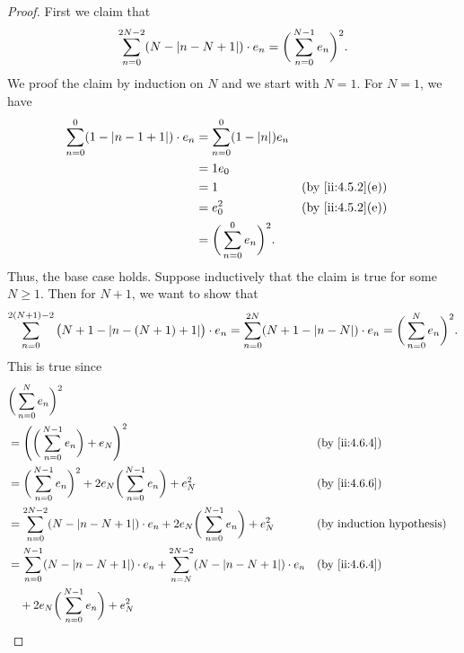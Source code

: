 \begin{proof}
  First we claim that
  \[
    \sum_{n = 0}^{2N - 2} (N - \left\lvert n - N + 1\right\rvert) \cdot e_n = \bigg(\sum_{n = 0}^{N - 1} e_n\bigg)^2.
  \]
  We proof the claim by induction on \(N\) and we start with \(N = 1\).
  For \(N = 1\), we have
  \begin{align*}
    \sum_{n = 0}^0 (1 - \abs{n - 1 + 1}) \cdot e_n & = \sum_{n = 0}^0 (1 - \abs{n}) e_n                        \\
                                                   & = 1 e_0                                                   \\
                                                   & = 1                                 &  & \by{ii:4.5.2}[e] \\
                                                   & = e_0^2                             &  & \by{ii:4.5.2}[e] \\
                                                   & = \bigg(\sum_{n = 0}^0 e_n\bigg)^2.
  \end{align*}
  Thus, the base case holds.
  Suppose inductively that the claim is true for some \(N \geq 1\).
  Then for \(N + 1\), we want to show that
  \[
    \sum_{n = 0}^{2(N + 1) - 2} \big(N + 1 - \abs{n - (N + 1) + 1}\big) \cdot e_n = \sum_{n = 0}^{2N} (N + 1 - \abs{n - N}) \cdot e_n = \bigg(\sum_{n = 0}^N e_n\bigg)^2.
  \]
  This is true since
  \begin{align*}
     & \bigg(\sum_{n = 0}^N e_n\bigg)^2                                                                                                                  \\
     & = \Bigg(\bigg(\sum_{n = 0}^{N - 1} e_n\bigg) + e_N\Bigg)^2                                                                     &  & \by{ii:4.6.4} \\
     & = \bigg(\sum_{n = 0}^{N - 1} e_n\bigg)^2 + 2 e_N \bigg(\sum_{n = 0}^{N - 1} e_n\bigg) + e_N^2                                  &  & \by{ii:4.6.6} \\
     & = \sum_{n = 0}^{2N - 2} (N - \abs{n - N + 1}) \cdot e_n + 2 e_N \bigg(\sum_{n = 0}^{N - 1} e_n\bigg) + e_N^2                   &  & \byIH         \\
     & = \sum_{n = 0}^{N - 1} (N - \abs{n - N + 1}) \cdot e_n + \sum_{n = N}^{2N - 2} (N - \abs{n - N + 1}) \cdot e_n                 &  & \by{ii:4.6.4} \\
     & \quad + 2 e_N \bigg(\sum_{n = 0}^{N - 1} e_n\bigg) + e_N^2                                                                                        \\

\end{align*}
\end{proof}
